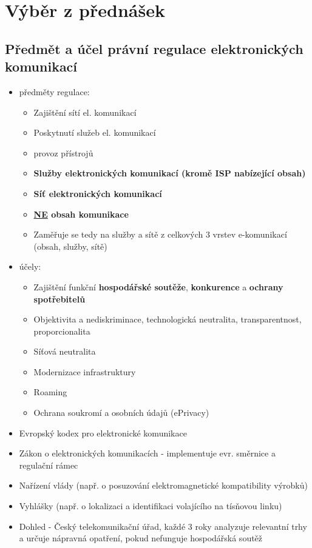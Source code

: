 \section{Výběr z přednášek}

\subsection{Předmět a účel právní regulace elektronických komunikací}
\begin{itemize}
    \item předměty regulace:
    \begin{itemize}
        \item Zajištění sítí el. komunikací
        \item Poskytnutí služeb el. komunikací
        \item provoz přístrojů
        \item \textbf{Služby elektronických komunikací (kromě ISP nabízející obsah)}
        \item \textbf{Síť elektronických komunikací}
        \item \textbf{\underline{NE} obsah komunikace}
        \item Zaměřuje se tedy na služby a sítě z celkových 3 vrstev e-komunikací (obsah, služby, sítě)
    \end{itemize}
    \item účely:
    \begin{itemize}
        \item Zajištění funkční \textbf{hospodářské soutěže}, \textbf{konkurence} a \textbf{ochrany spotřebitelů}
        \item Objektivita a nediskriminace, technologická neutralita, transparentnost, proporcionalita
        \item Síťová neutralita
        \item Modernizace infrastruktury
        \item Roaming
        \item Ochrana soukromí a osobních údajů (ePrivacy)
    \end{itemize}
    \item Evropský kodex pro elektronické komunikace
    \item Zákon o elektronických komunikacích - implementuje evr. směrnice a regulační rámec
    \item Nařízení vlády (např. o posuzování elektromagnetické kompatibility výrobků)
    \item Vyhlášky (např. o lokalizaci a identifikaci volajícího na tísňovou linku)
    \item Dohled - Český telekomunikační úřad, každé 3 roky analyzuje relevantní trhy a určuje nápravná opatření, pokud nefunguje hospodářská soutěž
\end{itemize}


